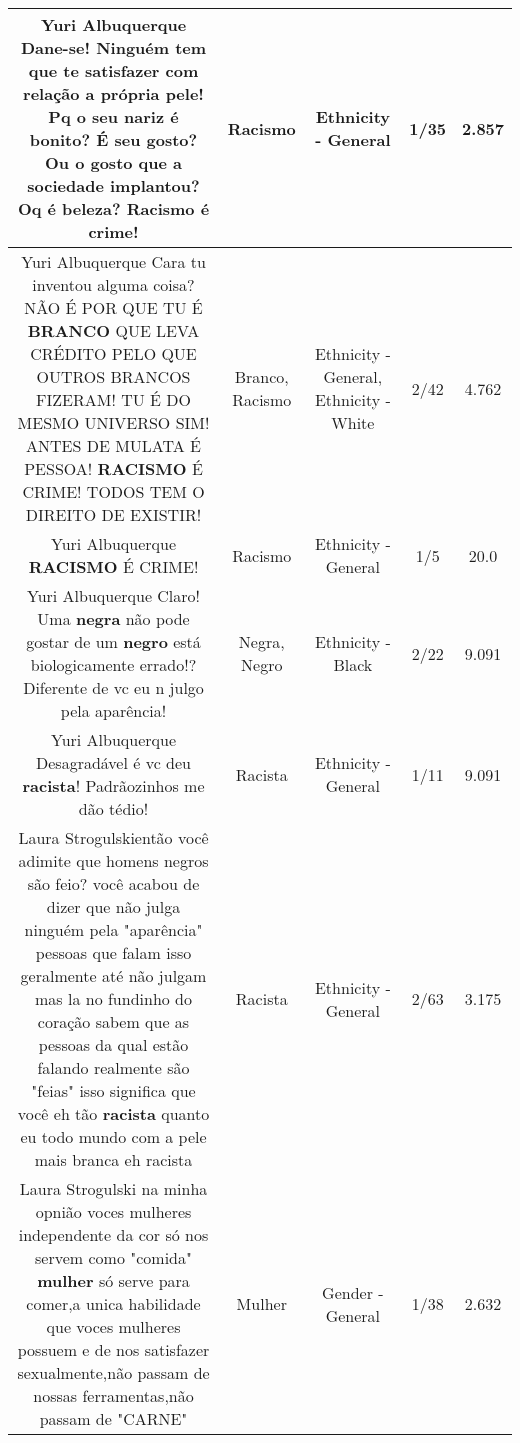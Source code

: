 \documentclass[11pt]{article}
\newlength\mylength
\begin{document}
\begin{center}
\begin{longtable}{|C{.65\mylength}|C{.30\mylength}|C{.12\mylength}|C{.12\mylength}|C{.12\mylength}|}
  \small Yuri Albuquerque Dane-se! Ninguém tem que te satisfazer com relação a própria pele! Pq o seu nariz é bonito? É seu gosto? Ou o gosto que a sociedade implantou? Oq é beleza? \textbf{Racismo} é crime!\normalsize   & Racismo & Ethnicity - General & 1/35 & 2.857 \\  \hline
  \small Yuri Albuquerque Cara tu inventou alguma coisa? NÃO É POR QUE TU É \textbf{BRANCO} QUE LEVA CRÉDITO PELO QUE OUTROS BRANCOS FIZERAM! TU É DO MESMO UNIVERSO SIM! ANTES DE MULATA É PESSOA! \textbf{RACISMO} É CRIME! TODOS TEM O DIREITO DE EXISTIR!\normalsize   & Branco, Racismo & Ethnicity - General, Ethnicity - White & 2/42 & 4.762 \\  \hline
  \small Yuri Albuquerque \textbf{RACISMO} É CRIME!\normalsize   & Racismo & Ethnicity - General & 1/5 & 20.0 \\  \hline
  \small Yuri Albuquerque Claro! Uma \textbf{negra} não pode gostar de um \textbf{negro} está biologicamente errado!? Diferente de vc eu n julgo pela aparência!\normalsize   & Negra, Negro & Ethnicity - Black & 2/22 & 9.091 \\  \hline
  \small Yuri Albuquerque Desagradável é vc deu \textbf{racista}! Padrãozinhos me dão tédio!\normalsize   & Racista & Ethnicity - General & 1/11 & 9.091 \\  \hline
  \small Laura Strogulskientão você adimite que homens negros são feio? você acabou de dizer que não julga ninguém pela "aparência" pessoas que falam isso geralmente até não julgam mas la no fundinho do coração sabem que as pessoas da qual estão falando realmente são "feias" isso significa que você eh tão \textbf{racista} quanto eu todo mundo com a pele mais branca eh racista\normalsize   & Racista & Ethnicity - General & 2/63 & 3.175 \\  \hline
  \small Laura Strogulski na minha opnião voces mulheres independente da cor só nos servem como "comida" \textbf{mulher} só serve para comer,a unica habilidade que voces mulheres possuem e de nos satisfazer sexualmente,não passam de nossas ferramentas,não passam de "CARNE"\normalsize   & Mulher & Gender - General & 1/38 & 2.632 \\  \hline

\end{longtable}
\end{center}
\end{document}
